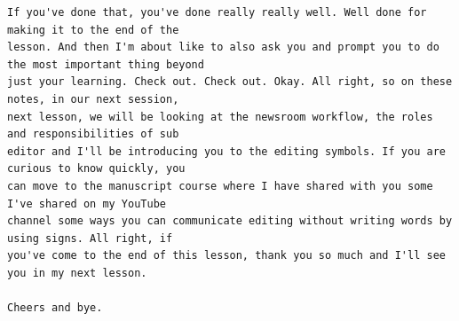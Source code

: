 {\begin{Verbatim}
If you've done that, you've done really really well. Well done for making it to the end of the
lesson. And then I'm about like to also ask you and prompt you to do the most important thing beyond
just your learning. Check out. Check out. Okay. All right, so on these notes, in our next session,
next lesson, we will be looking at the newsroom workflow, the roles and responsibilities of sub
editor and I'll be introducing you to the editing symbols. If you are curious to know quickly, you
can move to the manuscript course where I have shared with you some I've shared on my YouTube
channel some ways you can communicate editing without writing words by using signs. All right, if
you've come to the end of this lesson, thank you so much and I'll see you in my next lesson.

Cheers and bye.
\end{Verbatim}
}
